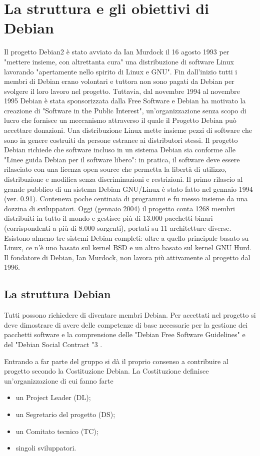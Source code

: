 \documentclass[a4paper,12pt,titlepage,oneside]{book}
\begin{document}
\section{La struttura e gli obiettivi di Debian}
    Il progetto Debian2 è stato avviato da Ian Murdock il 16 agosto 1993 per "mettere insieme, con altrettanta cura" una distribuzione di software Linux lavorando
    "apertamente nello spirito di Linux e GNU". Fin dall'inizio tutti i membri di Debian erano volontari
    e tuttora non sono pagati da Debian per svolgere il loro lavoro nel progetto. Tuttavia, dal novembre 
    1994 al novembre 1995 Debian è stata sponsorizzata dalla Free Software
    e Debian ha motivato la creazione di "Software in the Public Interest", un'organizzazione senza scopo 
    di lucro che fornisce un meccanismo attraverso il quale il Progetto Debian può accettare donazioni. 
    Una distribuzione Linux mette insieme pezzi di software che sono in genere costruiti da persone estranee ai distributori stessi.
    Il progetto Debian richiede che software incluso in un sistema Debian sia conforme alle "Linee guida Debian per il software libero": in pratica, il software
    deve essere rilasciato con una licenza open source che permetta la libertà di utilizzo, distribuzione e modifica senza discriminazioni e restrizioni.
    Il primo rilascio al grande pubblico di un sistema Debian GNU/Linux è stato fatto nel gennaio 1994 (ver. 0.91). Conteneva poche centinaia di programmi 
    e fu messo insieme da una dozzina di sviluppatori. Oggi (gennaio 2004) il progetto conta 1268 
    membri distribuiti in tutto il mondo e gestisce più di 13.000 pacchetti binari 
    (corrispondenti a più di 8.000 sorgenti), portati su 11 architetture diverse. Esistono almeno tre sistemi Debian completi: 
    oltre a quello principale basato su Linux, ce n'è uno basato sul kernel BSD e un altro basato sul kernel GNU Hurd.
    Il fondatore di Debian, Ian Murdock, non lavora più attivamente al progetto dal 1996.

    \subsection{La struttura Debian}
    Tutti possono richiedere di diventare membri Debian. Per accettati nel progetto si deve dimostrare di
    avere delle competenze di base necessarie per la gestione dei pacchetti
    software e la comprensione delle "Debian Free Software Guidelines" e del "Debian Social Contract "3 .

    Entrando a far parte del gruppo si dà il proprio consenso a contribuire al progetto secondo la Costituzione Debian. La Costituzione definisce un'organizzazione
    di cui fanno farte 
    \begin{itemize}
        \item un Project Leader (DL);
        \item un Segretario del progetto (DS);
        \item un Comitato tecnico (TC);
        \item singoli sviluppatori.
    \end{itemize}
    
\end{document}
